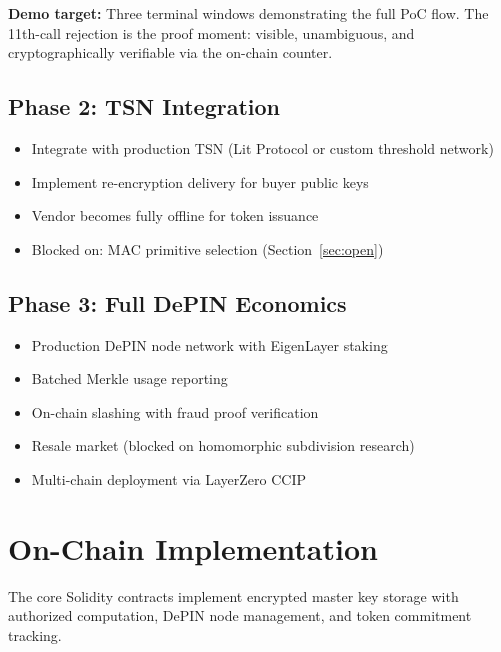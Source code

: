 \documentclass[conference]{IEEEtran}
\begin{document}
\textbf{Demo target:} Three terminal windows demonstrating the full PoC flow. The
11th-call rejection is the proof moment: visible, unambiguous, and cryptographically
verifiable via the on-chain counter.

\subsection{Phase 2: TSN Integration}
\begin{itemize}
\item Integrate with production TSN (Lit Protocol or custom threshold network)
\item Implement re-encryption delivery for buyer public keys
\item Vendor becomes fully offline for token issuance
\item Blocked on: MAC primitive selection (Section~\ref{sec:open})
\end{itemize}

\subsection{Phase 3: Full DePIN Economics}
\begin{itemize}
\item Production DePIN node network with EigenLayer staking
\item Batched Merkle usage reporting
\item On-chain slashing with fraud proof verification
\item Resale market (blocked on homomorphic subdivision research)
\item Multi-chain deployment via LayerZero CCIP
\end{itemize}

\section{On-Chain Implementation}
\label{sec:impl}

The core Solidity contracts implement encrypted master key storage with authorized
computation, DePIN node management, and token commitment tracking.
\end{document}
